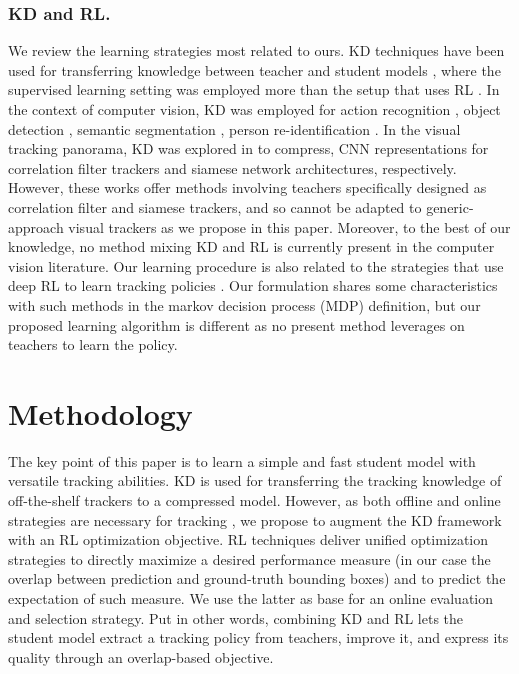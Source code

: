 \documentclass[runningheads]{llncs}
\begin{document}
\subsubsection{KD and RL.} We review the learning strategies most related to ours. KD techniques have been used for transferring knowledge between teacher and student models \cite{Bucila2006,Hinton2014KD}, where the supervised learning setting was employed more \cite{Geras2015,He2016ResNet,Tang2016,Li2017KDnoise} than the setup that uses RL \cite{Rusu2016,Parisotto2016}. 
In the context of computer vision, KD was employed for action recognition \cite{Garcia2018KDAR,Wank2019KDAR}, object detection \cite{Chen2017,Shmelkov2017}, semantic segmentation \cite{Liu2019semantic,He2019}, person re-identification \cite{Wu2019KDreid}. 
In the visual tracking panorama, KD was explored in \cite{Wang2019,Liu2019} to compress, CNN representations for correlation filter trackers and siamese network architectures, respectively. However, these works offer methods involving teachers specifically designed as correlation filter and siamese trackers, and so cannot be adapted to generic-approach visual trackers as we propose in this paper. Moreover, to the best of our knowledge, no method mixing KD and RL is currently present in the computer vision literature.
Our learning procedure is also related to the strategies that use deep RL to learn tracking policies \cite{Yun2017,Supancic2017,Ren2018,Chen2018,Meshgi2019}. Our formulation shares some characteristics with such methods in the markov decision process (MDP) definition, but our proposed learning algorithm is different as no present method leverages on teachers to learn the policy.
 
\section{Methodology}
The key point of this paper is to learn a simple and fast student model with versatile tracking abilities. KD is used for transferring the tracking knowledge of off-the-shelf trackers to a compressed model. 
However, as both offline and online strategies are necessary for tracking \cite{ATOM,DiMP,Yun2017,Chen2018}, we propose to augment the KD framework with an RL optimization objective. RL techniques deliver unified optimization strategies to directly maximize a desired performance measure (in our case the overlap between prediction and ground-truth bounding boxes) and to predict the expectation of such measure. We use the latter as base for an online evaluation and selection strategy. Put in other words, combining KD and RL lets the student model extract a tracking policy from teachers, improve it, and express its quality through an overlap-based objective.
\end{document}
